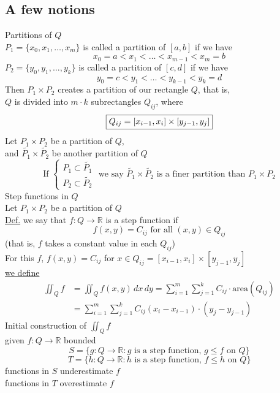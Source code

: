 \documentclass[12pt]{article}
\newcommand*\circled[1]{\tikz[baseline=(char.base)]{
    \node[shape=circle,draw,inner sep=2pt] (char) {#1};}}
\newcommand{\BR}{\mathbb R}
\begin{document}
\subsection*{A few notions}
\circled{1} Partitions of $Q$ \\
$P_1=\{x_0,x_1,\dots,x_m\}$ is called a partition of $[a,b]$ if we have \\
\[ x_0=a<x_1<\dots<x_{m-1}<x_m=b \]
$P_2=\{y_0,y_1,\dots,y_k\}$ is called a partition of $[c,d]$ if we have \\
\[ y_0=c<y_1<\dots<y_{k-1}<y_k=d \]
Then $P_1\times P_2$ creates a partition of our rectangle $Q$, that is, \\
$Q$ is divided into $m\cdot k$ subrectangles $Q_{ij}$, where \\
\[ \fbox{$Q_{ij}=[x_{i-1},x_i]\times[y_{j-1},y_j]$} \]
\circled{2} Let $P_1\times P_2$ be a partition of $Q$, \\
and $\widetilde{P_1}\times\widetilde{P_2}$ be another partition of $Q$ \\
\[ \text{If }\begin{cases}
  P_1\subset\widetilde{P_1} \\
  P_2\subset\widetilde{P_2}
\end{cases}\text{ we say }\widetilde{P_1}\times\widetilde{P_2}\text{ is a finer partition than }P_1\times P_2 \]
\circled{3} Step functions in $Q$ \\
Let $P_1\times P_2$ be a partition of $Q$ \\
\underline{Def.} we say that $f:Q\rightarrow\BR$ is a step function if \\
\[ f(x,y)=C_{ij}\text{ for all }(x,y)\in Q_{ij} \]
(that is, $f$ takes a constant value in each $Q_{ij}$) \\
For this $f$, $f(x,y)=C_{ij}$ for $x\in Q_{ij}=[x_{i-1},x_i]\times[y_{j-1},y_j]$ \\
\underline{we define} \\
\begin{align*}
  \iint_Qf & =\iint_Qf(x,y)\,dx\,dy=\sum_{i=1}^m\sum_{j=1}^kC_{ij}\cdot\text{area}(Q_{ij}) \\
  & = \sum_{i=1}^m\sum_{j=1}^kC_{ij}(x_i-x_{i-1})\cdot(y_j-y_{j-1})
\end{align*}
Initial construction of $\iint_Qf$ \\
given $f:Q\rightarrow\BR$ bounded \\
\[ S=\{g:Q\rightarrow\BR:g\text{ is a step function, }g\leq f\text{ on } Q\} \]
\[ T=\{h:Q\rightarrow\BR:h\text{ is a step function, }f\leq h\text{ on } Q\} \]
functions in $S$ underestimate $f$ \\
functions in $T$ overestimate $f$ \\
\end{document}
